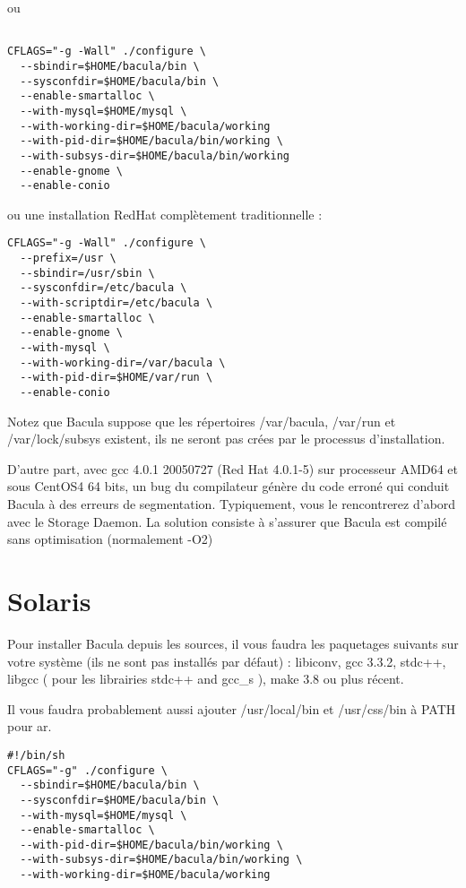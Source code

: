 {{{{{{ou 

\footnotesize
\begin{verbatim}
 
CFLAGS="-g -Wall" ./configure \
  --sbindir=$HOME/bacula/bin \
  --sysconfdir=$HOME/bacula/bin \
  --enable-smartalloc \
  --with-mysql=$HOME/mysql \
  --with-working-dir=$HOME/bacula/working
  --with-pid-dir=$HOME/bacula/bin/working \
  --with-subsys-dir=$HOME/bacula/bin/working
  --enable-gnome \
  --enable-conio
\end{verbatim}
\normalsize

ou une installation RedHat compl\`etement traditionnelle : 

\footnotesize
\begin{verbatim}
CFLAGS="-g -Wall" ./configure \
  --prefix=/usr \
  --sbindir=/usr/sbin \
  --sysconfdir=/etc/bacula \
  --with-scriptdir=/etc/bacula \
  --enable-smartalloc \
  --enable-gnome \
  --with-mysql \
  --with-working-dir=/var/bacula \
  --with-pid-dir=$HOME/var/run \
  --enable-conio
\end{verbatim}
\normalsize

Notez que Bacula suppose que les r\'epertoires /var/bacula, /var/run et
/var/lock/subsys existent, ils ne seront pas cr\'ees par le processus
d'installation. 

D'autre part, avec gcc 4.0.1 20050727 (Red Hat 4.0.1-5) sur processeur AMD64 
et sous CentOS4 64 bits, un bug du compilateur g\'en\`ere du code erron\'e qui 
conduit Bacula \`a des erreurs de segmentation. Typiquement, vous le rencontrerez 
d'abord avec le Storage Daemon. La solution consiste \`a s'assurer que Bacula est 
compil\'e sans optimisation (normalement -O2)

\section{Solaris}
\index[general]{Solaris }

Pour installer Bacula depuis les sources, il vous faudra les paquetages suivants 
sur votre syst\`eme (ils ne sont pas install\'es par d\'efaut) : libiconv, gcc 3.3.2, stdc++, libgcc 
( pour les librairies stdc++ and gcc\_s ), make 3.8 ou plus r\'ecent.

Il vous faudra probablement aussi ajouter /usr/local/bin et /usr/css/bin \`a PATH pour ar.

\footnotesize
\begin{verbatim}
#!/bin/sh
CFLAGS="-g" ./configure \
  --sbindir=$HOME/bacula/bin \
  --sysconfdir=$HOME/bacula/bin \
  --with-mysql=$HOME/mysql \
  --enable-smartalloc \
  --with-pid-dir=$HOME/bacula/bin/working \
  --with-subsys-dir=$HOME/bacula/bin/working \
  --with-working-dir=$HOME/bacula/working
\end{verbatim}
\normalsize

}}}}}}
